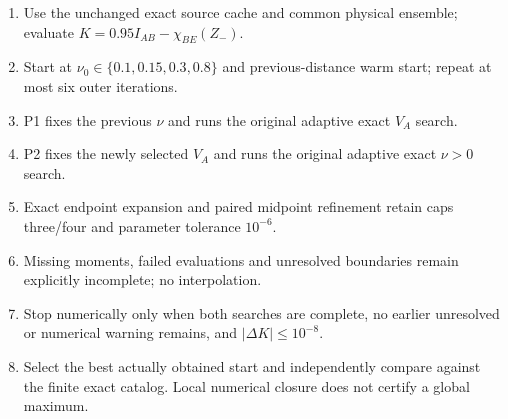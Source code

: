 \begin{enumerate}
\item Use the unchanged exact source cache and common physical ensemble; evaluate $K=0.95I_{AB}-\chi_{BE}(Z_-)$.
\item Start at $\nu_0\in\{0.1,0.15,0.3,0.8\}$ and previous-distance warm start; repeat at most six outer iterations.
\item P1 fixes the previous $\nu$ and runs the original adaptive exact $V_A$ search.
\item P2 fixes the newly selected $V_A$ and runs the original adaptive exact $\nu>0$ search.
\item Exact endpoint expansion and paired midpoint refinement retain caps three/four and parameter tolerance $10^{-6}$.
\item Missing moments, failed evaluations and unresolved boundaries remain explicitly incomplete; no interpolation.
\item Stop numerically only when both searches are complete, no earlier unresolved or numerical warning remains, and $|\Delta K|\le10^{-8}$.
\item Select the best actually obtained start and independently compare against the finite exact catalog. Local numerical closure does not certify a global maximum.
\end{enumerate}
